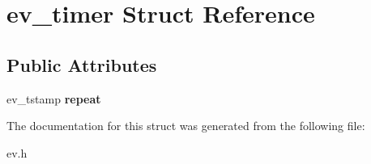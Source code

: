 \hypertarget{structev__timer}{}\section{ev\+\_\+timer Struct Reference}
\label{structev__timer}
\subsection*{Public Attributes}
\begin{DoxyCompactItemize}
\item 
\hypertarget{structev__timer_a4d2b34c259adabc6ddc738b89341c249}{}\label{structev__timer_a4d2b34c259adabc6ddc738b89341c249} 
ev\+\_\+tstamp {\bfseries repeat}
\end{DoxyCompactItemize}


The documentation for this struct was generated from the following file\+:\begin{DoxyCompactItemize}
\item 
ev.\+h\end{DoxyCompactItemize}
